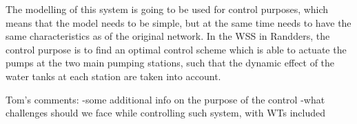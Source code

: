 The modelling of this system is going to be used for control purposes, which means that the model needs to be simple, but at the same time needs to have the same characteristics as of the original network. In the WSS in Randders, the control purpose is to find an optimal control scheme which is able to actuate the pumps at the two main pumping stations, such that the dynamic effect of the water tanks at each station are taken into account. 

Tom's comments:\newline
-some additional info on the purpose of the control \newline
-what challenges should we face while controlling such system, with WTs included








